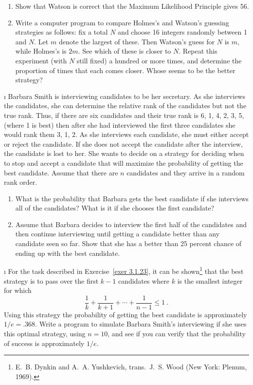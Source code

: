 \begin{LJSItem}
\begin{enumerate}
\item Show that Watson is correct that the Maximum Likelihood Principle gives 56.

\item Write a computer program to compare Holmes's and Watson's guessing strategies as
follows: fix a total $N$ and choose 16 integers randomly between 1 and $N$.  Let $m$
denote the largest of these.  Then Watson's guess for $N$ is $m$, while Holmes's is
$2m$.  See which of these is closer to $N$.  Repeat this experiment (with $N$ still
fixed) a hundred or more times, and determine the proportion of times that each comes
closer.  Whose seems to be the better strategy?
\end{enumerate}

\i\label{exer 3.1.23} Barbara Smith is interviewing candidates to be her secretary. 
As she interviews the candidates, she can determine the relative rank of the
candidates but not the true rank.  Thus, if there are six candidates and their true
rank is 6, 1, 4, 2, 3, 5, (where 1 is best) then after she had interviewed the first
three candidates she would rank them 3, 1, 2.  As she interviews each candidate, she
must either accept or reject the candidate.  If she does not accept the candidate
after the interview, the candidate is lost to her.  She wants to decide on a strategy
for deciding when to stop and accept a candidate that will maximize the probability of
getting the best candidate.  Assume that there are $n$ candidates and they arrive in a
random rank order.

\begin{enumerate}
\item What is the probability that Barbara gets the best candidate if she interviews
all of the candidates?  What is it if she chooses the first candidate?

\item Assume that Barbara decides to interview the first half of the candidates and
then continue interviewing until getting a candidate better than any candidate seen so
far.  Show that she has a better than 25 percent chance of ending up with the best
candidate.
\end{enumerate}

\i\label{exer 3.1.24} For the task described in Exercise~\ref{exer 3.1.23}, it can
be shown\footnote{E.~B. Dynkin and A.~A. Yushkevich,  trans.~J.~S. Wood (New York: Plenum, 1969).} that the best strategy is
to pass over the first $k - 1$ candidates where $k$ is the smallest integer for which
$$
\frac 1k + \frac 1{k + 1} + \cdots + \frac 1{n - 1} \leq 1\ .
$$ Using this strategy the probability of getting the best candidate is approximately
$1/e = .368$.  Write a program to simulate Barbara Smith's interviewing if she uses
this optimal strategy, using $n = 10$, and see if you can verify that the probability
of success is approximately $1/e$.
\end{LJSItem}
\vspace{.25in}

